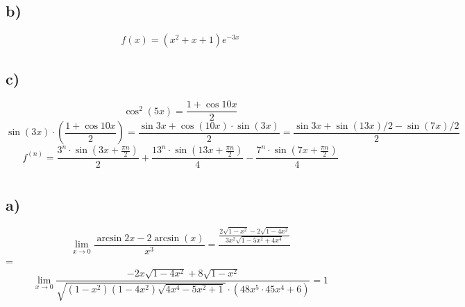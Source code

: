 	\subsection*{b)}
	$$f(x) = (x^2+x+1)e^{-3x}$$
	\subsection*{c)}
	$$\cos^2(5x) = \frac{1+\cos10x}{2}$$
	$$\sin(3x)\cdot(\frac{1+\cos10x}{2}) = \frac{\sin{3x}+\cos(10x)\cdot\sin(3x)}{2} = \frac{\sin3x+\sin(13x)/2-\sin(7x)/2}{2}$$
	$$f^{(n)} = \frac{3^n\cdot\sin{(3x+\frac{\pi n}{2})}}{2} + \frac{13^n\cdot\sin{(13x+\frac{\pi n}{2})}}{4}- \frac{7^n\cdot\sin{(7x+\frac{\pi n}{2})}}{4}$$
	\section{}
	\subsection*{a)}
	$$\lim_{x\to 0}\frac{\arcsin{2x}-2\arcsin(x)}{x^3} = \frac{\frac{2\sqrt{1-x^2}-2\sqrt{1-4x^2}}{3x^2\sqrt{1-5x^2+4x^4}}}{}$$ = $$\lim_{x\to0}\frac{-2x\sqrt{1-4x^2} +8\sqrt{1-x^2}}{\sqrt{(1-x^2)(1-4x^2)\sqrt{4x^4-5x^2+1}}\cdot(48x^5\cdot45x^4+6)} = 1$$
